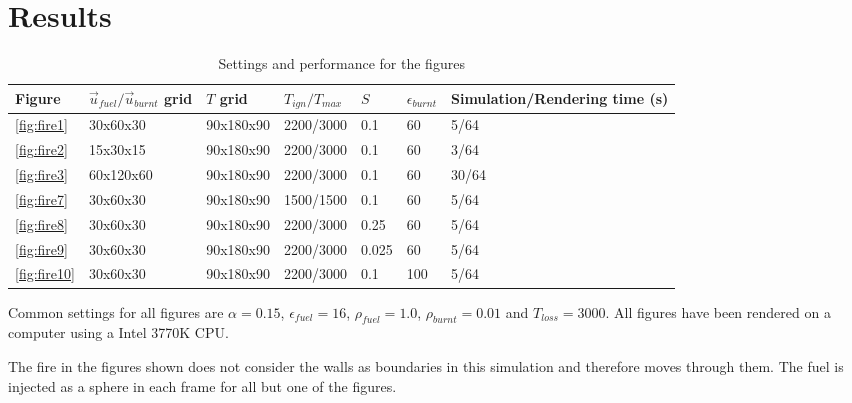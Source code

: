 \section{Results}

\begin{table}[h!]\footnotesize
\caption{Settings and performance for the figures}
\begin{tabular}{lllllll}
\hline
Figure & $\vec{u}_{fuel}/\vec{u}_{burnt}$ grid & $T$ grid & $T_{ign}/T_{max}$ & $S$ & $\epsilon_{burnt}$ & Simulation/Rendering time (s) \\
\hline
\ref{fig:fire1}      &	30x60x30	&	90x180x90	&	2200/3000	&	0.1	&		60	&	5/64	\\
\ref{fig:fire2}      &	15x30x15	&	90x180x90	&	2200/3000	&	0.1	&		60	&	3/64	\\
\ref{fig:fire3}      &	60x120x60	&	90x180x90	&	2200/3000	&	0.1	&		60	&	30/64	\\
\ref{fig:fire7}      &	30x60x30	&	90x180x90	&	1500/1500	&	0.1	&		60	&	5/64	\\
\ref{fig:fire8}      &	30x60x30	&	90x180x90	&	2200/3000	&	0.25	&	60	&	5/64	\\
\ref{fig:fire9}      &	30x60x30	&	90x180x90	&	2200/3000	&	0.025	&	60	&	5/64	\\
\ref{fig:fire10}     &	30x60x30	&	90x180x90	&	2200/3000	&	0.1		&	100	&	5/64	\\
\hline
\end{tabular}
\end{table}

Common settings for all figures are $\alpha = 0.15$, $\epsilon_{fuel} = 16$,  $\rho_{fuel} = 1.0$, $\rho_{burnt} = 0.01$ and $T_{loss} = 3000$. All figures have been rendered on a computer using a Intel 3770K CPU. 

The fire in the figures shown does not consider the walls as boundaries in this simulation and therefore moves through them. The fuel is injected as a sphere in each frame for all but one of the figures.

